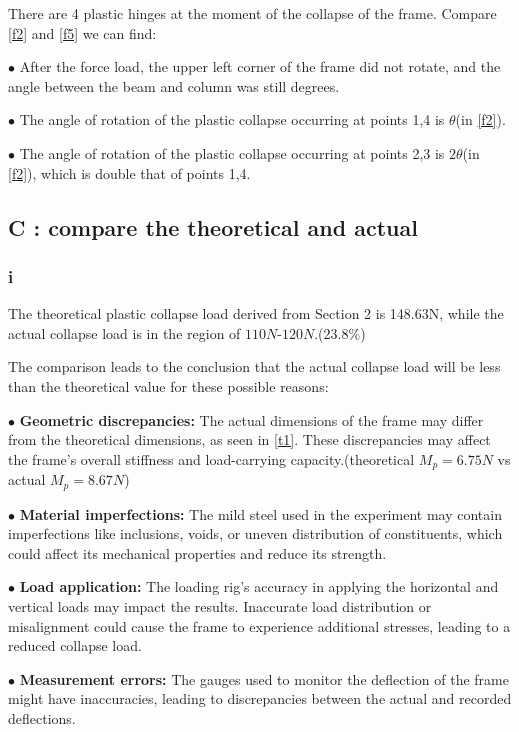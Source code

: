 There are 4 plastic hinges at the moment of the collapse of the frame. Compare \autoref{f2} and \autoref{f5} we can find: 

$\bullet$ After the force load, the upper left corner of the frame did not rotate, and the angle between the beam and column was still degrees.

$\bullet$ The angle of rotation of the plastic collapse occurring at points 1,4 is $\theta$(in \autoref{f2}).

$\bullet$ The angle of rotation of the plastic collapse occurring at points 2,3 is $2\theta$(in \autoref{f2}), which is double that of points 1,4.

\subsection*{C : compare the theoretical and actual}
\subsubsection*{i}

The theoretical plastic collapse load derived from Section 2 is 148.63N, while the actual collapse load is in the region of $110N$-$120N$.($23.8\%$)

The comparison leads to the conclusion that the actual collapse load will be less than the theoretical value for these possible reasons:

$\bullet$ \textbf{Geometric discrepancies:} The actual dimensions of the frame may differ from the theoretical dimensions, as seen in \autoref{t1}. These discrepancies may affect the frame's overall stiffness and load-carrying capacity.(theoretical $M_p=6.75N$ vs actual $M_p=8.67N$)

$\bullet$ \textbf{Material imperfections:} The mild steel used in the experiment may contain imperfections like inclusions, voids, or uneven distribution of constituents, which could affect its mechanical properties and reduce its strength.

$\bullet$ \textbf{Load application:} The loading rig's accuracy in applying the horizontal and vertical loads may impact the results. Inaccurate load distribution or misalignment could cause the frame to experience additional stresses, leading to a reduced collapse load.

$\bullet$ \textbf{Measurement errors:} The gauges used to monitor the deflection of the frame might have inaccuracies, leading to discrepancies between the actual and recorded deflections.

